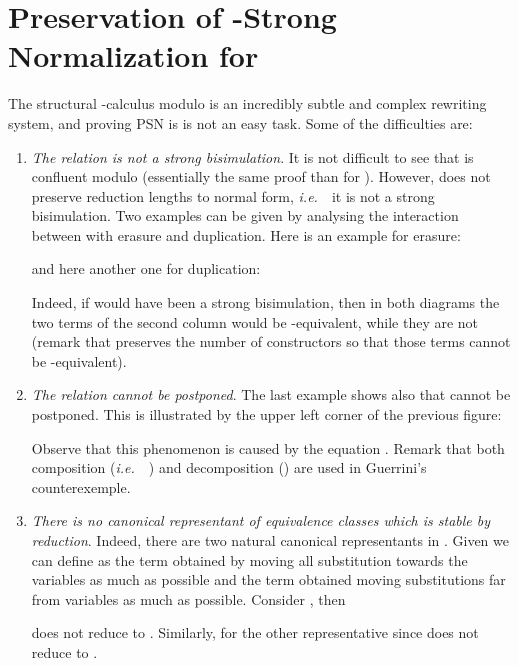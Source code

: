 \documentclass{LMCS}
\newcommand{\ie}{{\it  i.e.}~}
\renewcommand{\>}{\rightarrow}
\newcommand{\ignore}[1]{}
\begin{document}
\ignore{
For the na\"ive equations it is possible to show that  implies
, while   does not  imply , as Lemma \ref{xxx} will show.
}


\section{Preservation of -Strong Normalization for }
\label{sec:psn}

The structural -calculus modulo  is an incredibly subtle and complex
rewriting system, and proving PSN is 
is not an easy task. Some of the difficulties are:
  
\begin{enumerate}[]
\item \textit{The relation  is not a strong bisimulation}.  It
  is not difficult to see that  is confluent modulo 
  (essentially the same proof than for ). However,  does
  not preserve reduction lengths to normal form, \ie\  it is not a
  strong bisimulation. Two  examples can be given by analysing the
  interaction  between  with erasure and duplication. 
  Here is an example for erasure:  
   
and here another  one for duplication:
      
Indeed, if  would have been a strong bisimulation, then in both diagrams
the two terms of the second column would be -equivalent, while
they are not (remark that  preserves the number of constructors
so that those terms cannot be -equivalent).


\item \textit{The relation  cannot be postponed}. The last
  example shows also that  cannot be postponed. 
This is illustrated by the upper left corner of
the previous figure:

Observe that this phenomenon is caused by
the equation . Remark that both
composition (\ie\ ) and decomposition 
() are used in Guerrini's
counterexemple. 
\ignore{Surprisingly, from our study we learned that dealing
with decomposition is more complicate than dealing with composition. 
\item \textit{Erasures cannot be postponed}.  Consider 

the two steps cannot be permuted. This is a phenomenon
concerning  too, except that  can be postponed
with respect to  (Lemma~\ref{l:eqo-bisim}),
and then  can be postponed
with respect to . Unfortunately,  cannot be delayed in  and so 
neither  can.
}
\item \label{it:in-out-instability}\textit{There is no canonical representant of equivalence
  classes which is stable by reduction}. Indeed, there are two natural
  canonical representants in . Given  we can define  as the term obtained by moving all substitution towards
  the variables as much as possible and  the term obtained moving substitutions far from variables
  as much as possible. Consider 
,
then 

does not reduce to .
Similarly, for the other representative
since 
does not reduce to .\medskip
\end{enumerate}
\end{document}
